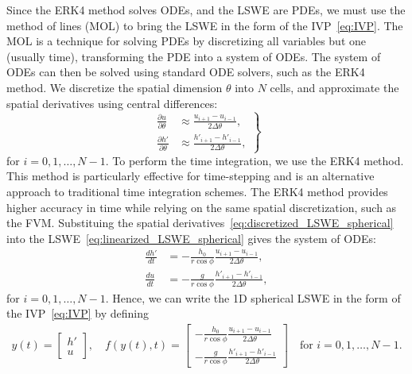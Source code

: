 Since the ERK4 method solves ODEs, and the LSWE are PDEs, we must use the method of lines (MOL) to bring the LSWE in the form of the IVP~\eqref{eq:IVP}.
The MOL is a technique for solving PDEs by discretizing all variables but one (usually time), transforming the PDE into a system of ODEs.
The system of ODEs can then be solved using standard ODE solvers, such as the ERK4 method.
We discretize the spatial dimension $\theta$ into $N$ cells, and approximate the spatial derivatives using central differences:
\begin{equation}\label{eq:discretized_LSWE_spherical}
    \left.
    \begin{aligned}
        \frac{\partial u}{\partial \theta} &\approx \frac{u_{i+1} - u_{i-1}}{2 \Delta \theta}, \\
        \frac{\partial h'}{\partial \theta} &\approx \frac{h'_{i+1} - h'_{i-1}}{2 \Delta \theta},
    \end{aligned}
    \right\}
\end{equation}
for $i = 0,1, \dots, N-1$.
To perform the time integration, we use the ERK4 method.
This method is particularly effective for time-stepping and is an alternative approach to traditional time integration schemes.
The ERK4 method provides higher accuracy in time while relying on the same spatial discretization, such as the FVM.
Substituing the spatial derivatives~\eqref{eq:discretized_LSWE_spherical} into the LSWE~\eqref{eq:linearized_LSWE_spherical} gives the system of ODEs:
\begin{equation}\label{eq:ODE_LSWE_spherical}
    \begin{aligned}
        \frac{d h'}{dt} &= -\frac{h_0}{r \cos\phi} \frac{u_{i+1} - u_{i-1}}{2 \Delta \theta}, \\
        \frac{d u}{dt} &= -\frac{g}{r \cos\phi} \frac{h'_{i+1} - h'_{i-1}}{2 \Delta \theta},
    \end{aligned}
\end{equation}
for $i = 0,1, \dots, N-1$.
Hence, we can write the 1D spherical LSWE in the form of the IVP~\eqref{eq:IVP} by defining 
\begin{align}
    y(t) = \begin{bmatrix}
        h' \\ u
    \end{bmatrix},
    \quad 
    f(y(t),t) = \begin{bmatrix}
        -\frac{h_0}{r \cos\phi} \frac{u_{i+1} - u_{i-1}}{2 \Delta \theta} \\ -\frac{g}{r \cos\phi} \frac{h'_{i+1} - h'_{i-1}}{2 \Delta \theta}
    \end{bmatrix}
    \quad \text{for } i = 0,1, \dots, N-1. 
\end{align}
